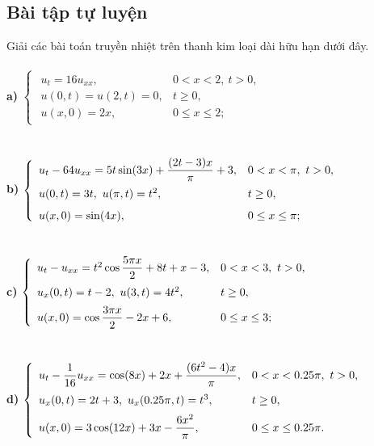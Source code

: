 \documentclass[10pt, a4paper]{article}
\begin{document}
	\subsection{Bài tập tự luyện}
	Giải các bài toán truyền nhiệt trên thanh kim loại dài hữu hạn dưới đây.\\\\
	\textbf{a) }$\begin{cases}
		\begin{array}{ll}
			u_t=16u_{xx}, & 0<x<2,~t>0, \\
			u(0,t)=u(2,t)=0, & t\ge0,\\
			u(x,0)=2x, & 0\le x\le2;
		\end{array}
	\end{cases}$\\\\\\
	\textbf{b) }$\begin{cases}
		\begin{array}{ll}
			u_t-64u_{xx}=5t\sin(3x)+\dfrac{(2t-3)x}{\pi}+3, & 0<x<\pi,~t>0, \\
			\noalign{\vskip4pt}
			u(0,t)=3t,~u(\pi,t)=t^2, & t\ge0,\\
			\noalign{\vskip5pt}
			u(x,0)=\sin(4x), & 0\le x\le\pi;
		\end{array}
	\end{cases}$\\\\\\
	\textbf{c) }$\begin{cases}
		\begin{array}{ll}
			u_t-u_{xx}=t^2\cos\dfrac{5\pi x}{2}+8t+x-3, & 0<x<3,~t>0, \\
			\noalign{\vskip5pt}
			u_x(0,t)=t-2,~u(3,t)=4t^2, & t\ge0,\\
			\noalign{\vskip5pt}
			u(x,0)=\cos\dfrac{3\pi x}{2}-2x+6, & 0\le x\le3;
		\end{array}
	\end{cases}$\\\\\\
	\textbf{d) }$\begin{cases}
		\begin{array}{ll}
			u_t-\dfrac1{16}u_{xx}=\cos(8x)+2x+\dfrac{(6t^2-4)x}{\pi}, & 0<x<0.25\pi,~t>0, \\
			\noalign{\vskip5pt}
			u_x(0,t)=2t+3,~u_x(0.25\pi,t)=t^3, & t\ge0,\\
			\noalign{\vskip5pt}
			u(x,0)=3\cos(12x)+3x-\dfrac{6x^2}{\pi}, & 0\le x\le0.25\pi.
		\end{array}
	\end{cases}$
	\newpage
\end{document}
